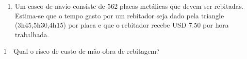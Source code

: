 \documentclass[11pt]{article}
\providecommand{\tightlist}{%
      \setlength{\itemsep}{0pt}\setlength{\parskip}{0pt}}
\begin{document}
    \begin{center}
    \end{center}
    { \hspace*{\fill} \\}
    
    \begin{center}
    \end{center}
    { \hspace*{\fill} \\}
    
    \begin{enumerate}
\def\labelenumi{\arabic{enumi})}
\setcounter{enumi}{1}
\tightlist
\item
  Um casco de navio consiste de 562 placas metálicas que devem ser
  rebitadas. Estima-se que o tempo gasto por um rebitador seja dado pela
  triangle (3h45,5h30,4h15) por placa e que o rebitador recebe USD 7.50
  por hora trabalhada.
\end{enumerate}

1 - Qual o risco de custo de mão-obra de rebitagem?
\end{document}

